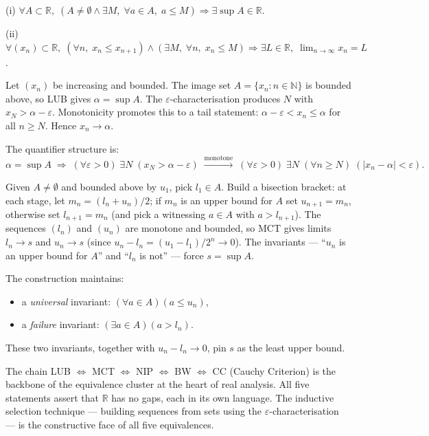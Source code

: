 \begin{remark}
(i) $\forall A\subset\mathbb{R},\;
    (A\neq\emptyset\land\exists M,\;\forall a\in A,\;a\leq M)
    \Rightarrow\exists\sup A\in\mathbb{R}$.

(ii) $\forall(x_n)\subset\mathbb{R},\;
    (\forall n,\;x_n\leq x_{n+1})\land(\exists M,\;\forall n,\;x_n\leq M)
    \Rightarrow\exists L\in\mathbb{R},\;\lim_{n\to\infty}x_n=L$.
\end{remark}

\begin{remark}
Let $(x_n)$ be increasing and bounded. The image set $A=\{x_n:n\in\mathbb{N}\}$
is bounded above, so LUB gives $\alpha=\sup A$. The
$\varepsilon$-characterisation produces $N$ with $x_N>\alpha-\varepsilon$.
Monotonicity promotes this to a tail statement: $\alpha-\varepsilon<x_n\leq\alpha$
for all $n\geq N$. Hence $x_n\to\alpha$.

The quantifier structure is:
\[
  \alpha=\sup A
  \;\Rightarrow\;
  (\forall\varepsilon>0)\;\exists N\;(x_N>\alpha-\varepsilon)
  \;\xrightarrow{\text{monotone}}\;
  (\forall\varepsilon>0)\;\exists N\;(\forall n\geq N)\;(|x_n-\alpha|<\varepsilon).
\]
\end{remark}

\begin{remark}
Given $A\neq\emptyset$ and bounded above by $u_1$, pick $l_1\in A$.
Build a bisection bracket: at each stage, let $m_n=(l_n+u_n)/2$; if $m_n$
is an upper bound for $A$ set $u_{n+1}=m_n$, otherwise set $l_{n+1}=m_n$
(and pick a witnessing $a\in A$ with $a>l_{n+1}$). The sequences $(l_n)$
and $(u_n)$ are monotone and bounded, so MCT gives limits
$l_n\to s$ and $u_n\to s$ (since $u_n-l_n=(u_1-l_1)/2^n\to 0$). The
invariants --- ``$u_n$ is an upper bound for $A$'' and ``$l_n$ is not'' ---
force $s=\sup A$.

\medskip
The construction maintains:
\begin{itemize}
  \item a \emph{universal} invariant: $(\forall a\in A)(a\leq u_n)$,
  \item a \emph{failure} invariant: $(\exists a\in A)(a>l_n)$.
\end{itemize}
These two invariants, together with $u_n-l_n\to 0$, pin $s$ as the least
upper bound.
\end{remark}

\begin{remark}
The chain LUB $\Leftrightarrow$ MCT $\Leftrightarrow$ NIP $\Leftrightarrow$
BW $\Leftrightarrow$ CC (Cauchy Criterion) is the backbone of the equivalence
cluster at the heart of real analysis. All five statements assert that
$\mathbb{R}$ has no gaps, each in its own language. The inductive selection
technique --- building sequences from sets using the $\varepsilon$-characterisation
--- is the constructive face of all five equivalences.
\end{remark}

